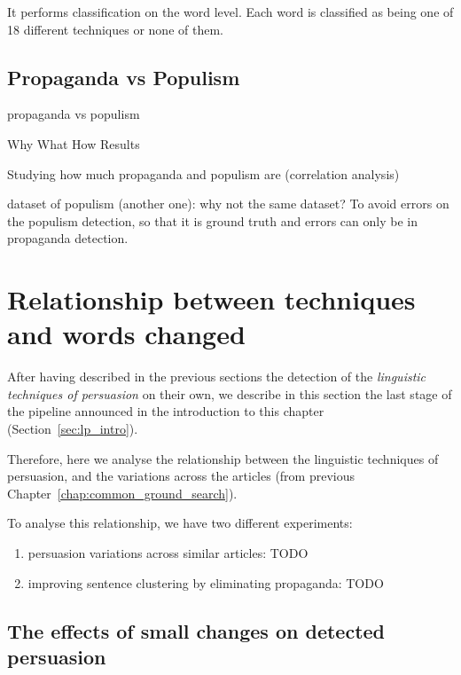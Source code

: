 It performs classification on the word level. Each word is classified as being one of 18 different techniques or none of them.



\subsection{\statusred Propaganda vs Populism}
\label{ssec:lp_techniques_populism_vs_propaganda}

propaganda vs populism

Why
What
How
Results

Studying how much propaganda and populism are (correlation analysis)

dataset of populism (another one): why not the same dataset? To avoid errors on the populism detection, so that it is ground truth and errors can only be in propaganda detection.


\section{Relationship between techniques and words changed}
\label{sec:lp_relationship}

After having described in the previous sections the detection of the \emph{linguistic techniques of persuasion} on their own, we describe in this section the last stage of the pipeline announced in the introduction to this chapter (Section~\ref{sec:lp_intro}).

Therefore, here we analyse the relationship between the linguistic techniques of persuasion, and the variations across the articles (from previous Chapter~\ref{chap:common_ground_search}).

To analyse this relationship, we have two different experiments:

\begin{enumerate}
    \item persuasion variations across similar articles: TODO
    \item improving sentence clustering by eliminating propaganda: TODO
\end{enumerate}

\subsection{\statusorange The effects of small changes on detected persuasion}

